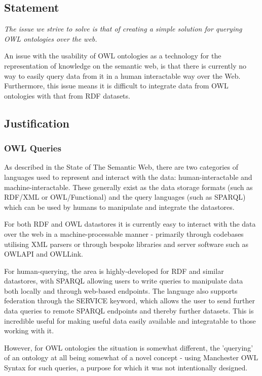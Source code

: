 \documentclass{article}
\begin{document}
\subsection{Statement}

\emph{The issue we strive to solve is that of creating a simple solution for querying
OWL ontologies over the web.}

An issue with the usability of OWL ontologies as a technology for the
representation of knowledge on the semantic web, is that there is currently no
way to easily query data from it in a human interactable way over the Web.
Furthermore, this issue means it is difficult to integrate data from OWL
ontologies with that from RDF datasets. 

\subsection{Justification}

\subsubsection{OWL Queries}

As described in the State of The Semantic Web, there are two categories of
languages used to represent and interact with the data: human-interactable and
machine-interactable. These generally exist as the data storage formats (such as
RDF/XML or OWL/Functional) and the query languages (such as SPARQL) which can be 
used by humans to manipulate and integrate the datastores.

For both RDF and OWL datastores it is currently easy to interact with the data
over the web in a machine-processable manner - primarily through codebases
utilising XML parsers or through bespoke libraries and server software such as 
OWLAPI and OWLLink.

For human-querying, the area is highly-developed for RDF and similar datastores, 
with SPARQL allowing users to write queries to manipulate data both locally and
through web-based endpoints. The language also supports federation through the
SERVICE keyword, which allows the user to send further data queries to remote
SPARQL endpoints and thereby further datasets. This is incredible useful for
making useful data easily available and integratable to those working with it.

However, for OWL ontologies the situation is somewhat different, the 'querying'
of an ontology at all being somewhat of a novel concept - using Manchester OWL
Syntax for such queries, a purpose for which it was not intentionally designed.
\end{document}
